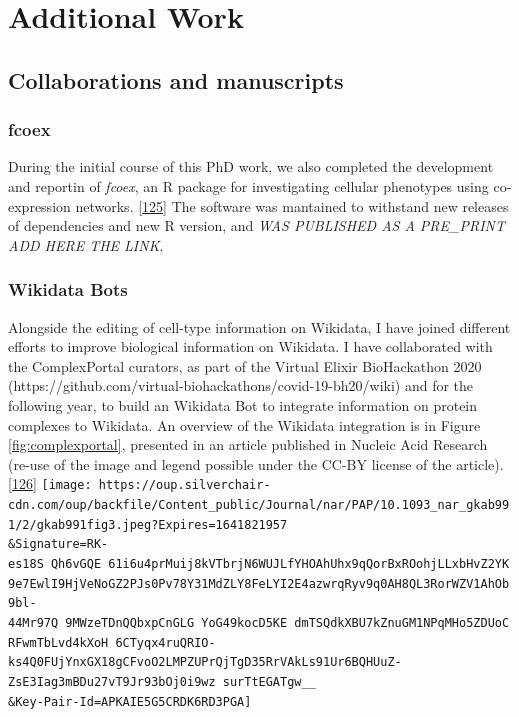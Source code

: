 \hypertarget{additional-work}{%
\section{Additional Work}\label{additional-work}}

\hypertarget{collaborations-and-manuscripts}{%
\subsection{Collaborations and manuscripts}\label{collaborations-and-manuscripts}}

\hypertarget{fcoex}{%
\subsubsection{fcoex}\label{fcoex}}

During the initial course of this PhD work, we also completed the development and reportin of \emph{fcoex}, an R package for investigating cellular phenotypes using co-expression networks. {[}\protect\hyperlink{ref-MxIeSJYt}{125}{]} The software was mantained to withstand new releases of dependencies and new R version, and \emph{WAS PUBLISHED AS A PRE\_PRINT ADD HERE THE LINK}.

\hypertarget{wikidata-bots}{%
\subsubsection{Wikidata Bots}\label{wikidata-bots}}

Alongside the editing of cell-type information on Wikidata, I have joined different efforts to improve biological information on Wikidata.
I have collaborated with the ComplexPortal curators, as part of the Virtual Elixir BioHackathon 2020 (https://github.com/virtual-biohackathons/covid-19-bh20/wiki) and for the following year, to build an Wikidata Bot to integrate information on protein complexes to Wikidata. An overview of the Wikidata integration is in Figure \ref{fig:complexportal}, presented in an article published in Nucleic Acid Research (re-use of the image and legend possible under the CC-BY license of the article). {[}\protect\hyperlink{ref-CQRJ53gu}{126}{]}
\texttt{[image: https://oup.silverchair-cdn.com/oup/backfile/Content\_public/Journal/nar/PAP/10.1093\_nar\_gkab991/2/gkab991fig3.jpeg?Expires=1641821957\\\&Signature=RK-es18S~Qh6vGQE~61i6u4prMuij8kVTbrjN6WUJLfYHOAhUhx9qQorBxROohjLLxbHvZ2YK9e7EwlI9HjVeNoGZ2PJs0Pv78Y31MdZLY8FeLYI2E4azwrqRyv9q0AH8QL3RorWZV1AhOb9bl-44Mr97Q~9MWzeTDnQQbxpCnGLG~YoG49kocD5KE~dmTSQdkXBU7kZnuGM1NPqMHo5ZDUoCRFwmTbLvd4kXoH~6CTyqx4ruQRIO-ks4Q0FUjYnxGX18gCFvoO2LMPZUPrQjTgD35RrVAkLs91Ur6BQHUuZ-ZsE3Iag3mBDu27vT9Jr93bOj0i9wz~surTtEGATgw\_\_\\\&Key-Pair-Id=APKAIE5G5CRDK6RD3PGA]}

